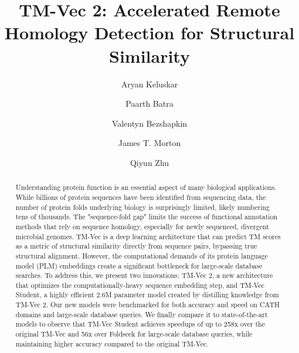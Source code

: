 \documentclass[runningheads]{llncs}
\begin{document}
%
\title{TM-Vec 2: Accelerated Remote Homology Detection for Structural Similarity}
%
%
\author{Aryan Keluskar  \and
Paarth Batra  \and
Valentyn Bezshapkin \and
James T. Morton \and
Qiyun Zhu}
%
%
%
\maketitle            
%
\begin{abstract}
Understanding protein function is an essential aspect of many biological applications. While billions of protein sequences have been identified from sequencing data, the number of protein folds underlying biology is surprisingly limited, likely numbering tens of thousands. The "sequence-fold gap" limits the success of functional annotation methods that rely on sequence homology, especially for newly sequenced, divergent microbial genomes. TM-Vec is a deep learning architecture that can predict TM scores as a metric of structural similarity directly from sequence pairs, bypassing true structural alignment. However, the computational demands of its protein language model (PLM) embeddings create a significant bottleneck for large-scale database searches. To address this, we present two innovations: TM-Vec 2, a new architecture that optimizes the computationally-heavy sequence embedding step, and TM-Vec Student, a highly efficient 2.6M parameter model created by distilling knowledge from TM-Vec 2. Our new models were benchmarked for both accuracy and speed on CATH domains and large-scale database queries. We finally compare it to state-of-the-art models to observe that TM-Vec Student achieves speedups of up to 258x over the original TM-Vec and 56x over Foldseek for large-scale database queries, while maintaining higher accuracy compared to the original TM-Vec.

\end{abstract}
\end{document}
